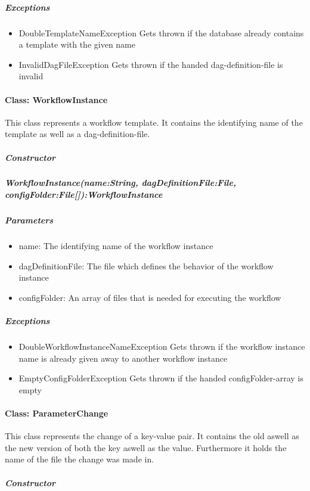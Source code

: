 \subparagraph{Exceptions}
\begin{itemize}
	\item{DoubleTemplateNameException}
	Gets thrown if the database already contains a template with the given name
	\item{InvalidDagFileException}
	Gets thrown if the handed dag-definition-file is invalid
\end{itemize}


\paragraph{Class: WorkflowInstance}
This class represents a workflow template. It contains the identifying name of the template as well as a dag-definition-file.
\subparagraph{Constructor}

\subparagraph{WorkflowInstance(name:String, dagDefinitionFile:File, configFolder:File[]):WorkflowInstance}

\subparagraph{Parameters}
\begin{itemize}
	\item{name:}
	The identifying name of the workflow instance
	\item{dagDefinitionFile:}
	The file which defines the behavior of the workflow instance
	\item{configFolder:}
	An array of files that is needed for executing the workflow
\end{itemize}

\subparagraph{Exceptions}
\begin{itemize}
	\item{DoubleWorkflowInstanceNameException}
	Gets thrown if the workflow instance name is already given away to another workflow instance
	\item{EmptyConfigFolderException}
	Gets thrown if the handed configFolder-array is empty
\end{itemize}


\paragraph{Class: ParameterChange}
This class represents the change of a key-value pair. It contains the old aswell as the new version of both the key aswell as the value. Furthermore it holds the name of the file the change was made in.
\subparagraph{Constructor}

